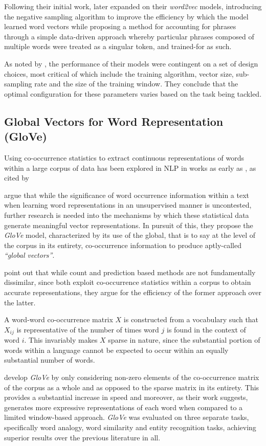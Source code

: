 \documentclass[../../fyp.tex]{subfiles}
\begin{document}
Following their initial work, \cite{mikolov2013b} later expanded on their \textit{word2vec} models, introducing the negative sampling algorithm to improve the efficiency by which the model learned word vectors while proposing a method for accounting for phrases through a simple data-driven approach whereby particular phrases composed of multiple words were treated as a singular token, and trained-for as such.

As noted by \cite{mikolov2013}, the performance of their models were contingent on a set of design choices, most critical of which include the training algorithm, vector size, sub-sampling rate and the size of the training window. They conclude that the optimal configuration for these parameters varies based on the task being tackled.

\subsection{Global Vectors for Word Representation (GloVe)}
Using co-occurrence statistics to extract continuous representations of words within a large corpus of data has been explored in NLP in works as early as \cite{rumelhart1988}, as cited by \cite{bojanowski2017}

\cite{pennington} argue that while the significance of word occurrence information within a text when learning word representations in an unsupervised manner is uncontested, further research is needed into the mechanisms by which these statistical data generate meaningful vector representations. In pursuit of this, they propose the \textit{GloVe} model, characterized by its use of the global, that is to say at the level of the corpus in its entirety, co-occurrence information to produce aptly-called \textit{\enquote{global vectors}}.

\cite{pennington} point out that while count and prediction based methods are not fundamentally dissimilar, since both exploit co-occurrence statistics within a corpus to obtain accurate representations, they argue for the efficiency of the former approach over the latter.

A word-word co-occurrence matrix $X$ is constructed from a vocabulary such that $X_{ij}$ is representative of the number of times word $j$ is found in the context of word $i$. This invariably makes $X$ sparse in nature, since the substantial portion of words within a language cannot be expected to occur within an equally substantial number of words.

\cite{pennington} develop \textit{GloVe} by only considering non-zero elements of the co-occurrence matrix of the corpus as a whole and as opposed to the sparse matrix in its entirety. This provides a substantial increase in speed and moreover, as their work suggests, generates more expressive representations of each word when compared to a limited window-based approach. \textit{GloVe} was evaluated on three separate tasks, specifically word analogy, word similarity and entity recognition tasks, achieving superior results over the previous literature in all. \cite{pennington}
\end{document}
